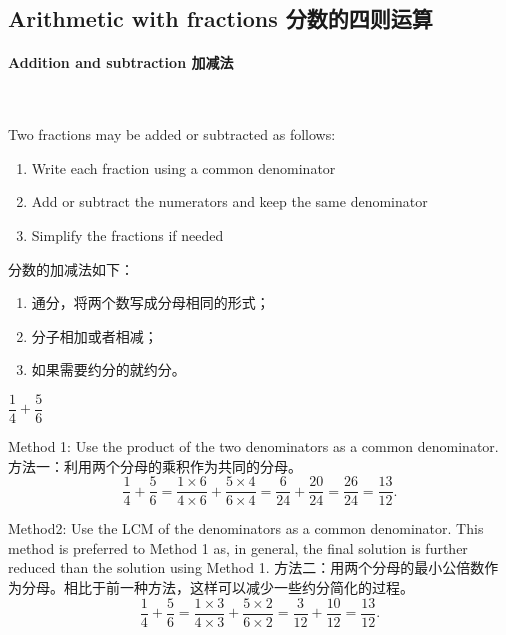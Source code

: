 \subsection{Arithmetic with fractions 分数的四则运算}

\paragraph{Addition and subtraction 加减法} \ \ \\

\begin{paracol}{2}
Two fractions may be added or subtracted as follows:
\begin{enumerate}
\item Write each fraction using a common denominator
\item Add or subtract the numerators and keep the same denominator
\item Simplify the fractions if needed
\end{enumerate}
\switchcolumn[1]
分数的加减法如下：\\ 
\begin{enumerate}
\item 通分，将两个数写成分母相同的形式；
\item 分子相加或者相减；\\ 
\item 如果需要约分的就约分。
\end{enumerate}
\end{paracol}

\begin{example}
$\dfrac{1}{4} + \dfrac{5}{6}$
\end{example}
\begin{solution}
Method 1: Use the product of the two denominators as a common denominator. 方法一：利用两个分母的乘积作为共同的分母。
$$
\dfrac{1}{4} + \dfrac{5}{6} = \dfrac{1\times 6}{4\times 6} + \dfrac{5\times 4}{6\times 4} = \dfrac{6}{24} + \dfrac{20}{24} = \dfrac{26}{24} = \dfrac{13}{12}.
$$

Method2: Use the LCM of the denominators as a common denominator. This method is preferred to Method 1 as, in general, the final solution is further reduced than the solution using Method 1. 方法二：用两个分母的最小公倍数作为分母。相比于前一种方法，这样可以减少一些约分简化的过程。
$$
\dfrac{1}{4} + \dfrac{5}{6} = \dfrac{1\times 3}{4\times3} + \dfrac{5\times 2}{6\times 2} = \dfrac{3}{12} + \dfrac{10}{12} = \dfrac{13}{12}.
$$


\end{solution}

